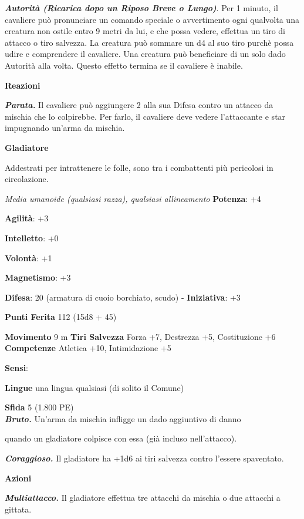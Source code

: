 \begin{multicols}{2}
\emph{\textbf{Autorità (Ricarica dopo un Riposo Breve o Lungo)}}. Per 1
minuto, il cavaliere può pronunciare un comando speciale o avvertimento
ogni qualvolta una creatura non ostile entro 9 metri da lui, e che possa
vedere, effettua un tiro di attacco o tiro salvezza. La creatura può
sommare un d4 al suo tiro purchè possa udire e comprendere il cavaliere.
Una creatura può beneficiare di un solo dado Autorità alla volta. Questo
effetto termina se il cavaliere è inabile.

\textbf{Reazioni}

\emph{\textbf{Parata.}} Il cavaliere può aggiungere 2 alla sua Difesa contro
un attacco da mischia che lo colpirebbe. Per farlo, il cavaliere deve
vedere l'attaccante e star impugnando un'arma da mischia.



\textbf{Gladiatore}

Addestrati per intrattenere le folle, sono tra i combattenti più
pericolosi in circolazione.

\emph{Media umanoide (qualsiasi razza), qualsiasi allineamento}
\textbf{Potenza}: +4

\textbf{Agilità}: +3

\textbf{Intelletto}: +0

\textbf{Volontà}: +1

\textbf{Magnetismo}: +3

\textbf{Difesa}: 20 (armatura di cuoio borchiato, scudo) - \textbf{Iniziativa}: +3

\textbf{Punti Ferita} 112 (15d8 + 45)

\textbf{Movimento} 9 m
\textbf{Tiri Salvezza} Forza +7, Destrezza +5, Costituzione +6
\textbf{Competenze} Atletica +10, Intimidazione +5

\textbf{Sensi}: 

\textbf{Lingue} una lingua qualsiasi (di solito il Comune)

\textbf{Sfida} 5 (1.800 PE)\smallskip\\

\emph{\textbf{Bruto.}} Un'arma da mischia infligge un dado aggiuntivo di
danno

quando un gladiatore colpisce con essa (già incluso nell'attacco).

\emph{\textbf{Coraggioso.}} Il gladiatore ha +1d6 ai tiri salvezza
contro l'essere spaventato.

\smallskip\textbf{Azioni}

\emph{\textbf{Multiattacco.}} Il gladiatore effettua tre attacchi da
mischia o due attacchi a gittata.


\end{multicols}
